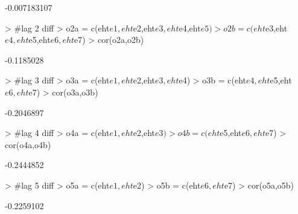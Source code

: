 \documentclass[11pt]{article}
\begin{document}
\begin{Schunk}
\begin{Soutput}
[1] -0.007183107
\end{Soutput}
\begin{Sinput}
> #lag 2 diff
> o2a = c(eht$e1,eht$e2,eht$e3,eht$e4,eht$e5)
> o2b = c(eht$e3,eht$e4,eht$e5,eht$e6,eht$e7)
> cor(o2a,o2b)
\end{Sinput}
\begin{Soutput}
[1] -0.1185028
\end{Soutput}
\begin{Sinput}
> #lag 3 diff  
> o3a = c(eht$e1,eht$e2,eht$e3,eht$e4)
> o3b = c(eht$e4,eht$e5,eht$e6,eht$e7)
> cor(o3a,o3b)
\end{Sinput}
\begin{Soutput}
[1] -0.2046897
\end{Soutput}
\begin{Sinput}
> #lag 4 diff
> o4a = c(eht$e1,eht$e2,eht$e3)
> o4b = c(eht$e5,eht$e6,eht$e7)
> cor(o4a,o4b)
\end{Sinput}
\begin{Soutput}
[1] -0.2444852
\end{Soutput}
\begin{Sinput}
> #lag 5 diff
> o5a = c(eht$e1,eht$e2)
> o5b = c(eht$e6,eht$e7)
> cor(o5a,o5b)
\end{Sinput}
\begin{Soutput}
[1] -0.2259102
\end{Soutput}
\end{Schunk}
\end{document}
